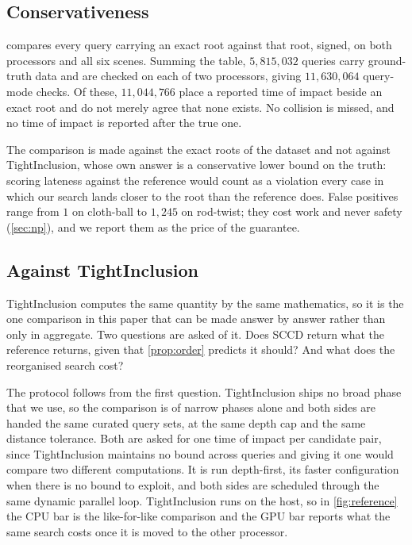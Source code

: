 

\subsection{Conservativeness}
\label{sec:results:cons}

 compares every query carrying an exact root against
that root, signed, on both processors and all six scenes. Summing the table,
$5{,}815{,}032$ queries carry ground-truth data and are checked on each of two
processors, giving $11{,}630{,}064$ query-mode checks. Of these,
$11{,}044{,}766$ place a reported time of impact beside an exact root and do not
merely agree that none exists. No collision is missed, and no time of impact is
reported after the true one.



The comparison is made against the exact roots of the dataset and not against
TightInclusion, whose own answer is a conservative lower bound on the truth:
scoring lateness against the reference would count as a violation every case in
which our search lands closer to the root than the reference does. False
positives range from $1$ on cloth-ball to $1{,}245$ on rod-twist; they cost work
and never safety (\cref{sec:np}), and we report them as the price of the
guarantee.

\subsection{Against TightInclusion}
\label{sec:results:ref}

TightInclusion computes the same quantity by the same mathematics, so it is the
one comparison in this paper that can be made answer by answer rather than only
in aggregate. Two questions are asked of it. Does SCCD return what the reference
returns, given that \cref{prop:order} predicts it should? And what does the
reorganised search cost?

The protocol follows from the first question. TightInclusion ships no broad phase
that we use, so the comparison is of narrow phases alone and both sides are
handed the same curated query sets, at the same depth cap and the same distance
tolerance. Both are asked for one time of impact per candidate pair, since
TightInclusion maintains no bound across queries and giving it one would compare
two different computations. It is run depth-first, its faster configuration when
there is no bound to exploit, and both sides are scheduled through the same
dynamic parallel loop. TightInclusion runs on the host, so in
\cref{fig:reference} the CPU bar is the like-for-like comparison and the GPU bar
reports what the same search costs once it is moved to the other processor.

